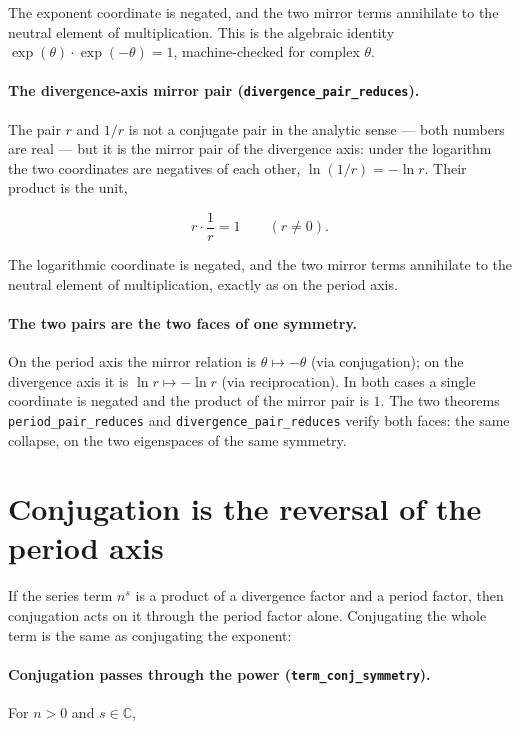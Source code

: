 \documentclass[sigplan,10pt,anonymous,review]{acmart}
\begin{document}
The exponent coordinate is negated, and the two mirror terms annihilate
to the neutral element of multiplication. This is the algebraic
identity $\exp(\theta) \cdot \exp(-\theta) = 1$, machine-checked for
complex $\theta$.

\paragraph{The divergence-axis mirror pair
(\texttt{divergence\_pair\_reduces}).} The pair $r$ and $1/r$ is not a
conjugate pair in the analytic sense --- both numbers are real --- but
it is the mirror pair of the divergence axis: under the logarithm the
two coordinates are negatives of each other,
$\ln(1/r) = -\ln r$. Their product is the unit,

\begin{equation*}
  r \cdot \frac{1}{r} = 1 \qquad (r \neq 0).
\end{equation*}

The logarithmic coordinate is negated, and the two mirror terms
annihilate to the neutral element of multiplication, exactly as on the
period axis.

\paragraph{The two pairs are the two faces of one symmetry.} On the
period axis the mirror relation is $\theta \mapsto -\theta$ (via
conjugation); on the divergence axis it is $\ln r \mapsto -\ln r$ (via
reciprocation). In both cases a single coordinate is negated and the
product of the mirror pair is $1$. The two theorems
\texttt{period\_pair\_reduces} and \texttt{divergence\_pair\_reduces}
verify both faces: the same collapse, on the two eigenspaces of the
same symmetry.

\section{Conjugation is the reversal of the period axis}

If the series term $n^s$ is a product of a divergence factor and a
period factor, then conjugation acts on it through the period factor
alone. Conjugating the whole term is the same as conjugating the
exponent:

\paragraph{Conjugation passes through the power
(\texttt{term\_conj\_symmetry}).} For $n > 0$ and $s \in \mathbb{C}$,
\end{document}

